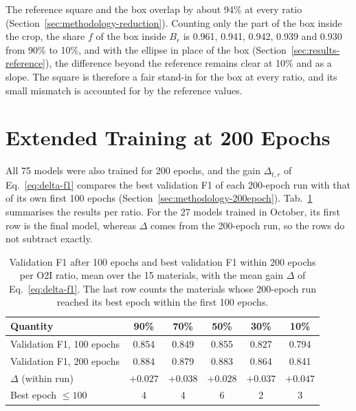 The reference square and the box overlap by about 94\% at every ratio
(Section~\ref{sec:methodology-reduction}).
Counting only the part of the box inside the crop, the share $f$ of the box inside
$B_r$ is 0.961, 0.941, 0.942, 0.939 and 0.930 from 90\% to 10\%, and with the ellipse
in place of the box (Section~\ref{sec:results-reference}), the difference beyond the
reference remains clear at 10\% and as a slope. The square is therefore a fair stand-in for the box at every
ratio, and its small mismatch is accounted for by the reference values.

\FloatBarrier
\section{Extended Training at 200 Epochs}
\label{sec:results-200epoch}

All 75 models were also trained for 200 epochs, and the gain $\Delta_{t,r}$ of
Eq.~\eqref{eq:delta-f1} compares the best validation F1 of each 200-epoch run with
that of its own first 100 epochs (Section~\ref{sec:methodology-200epoch}).
Tab.~\ref{tab:200epoch} summarises the results per ratio. For the 27
models trained in October, its first row is the final model, whereas $\Delta$ comes from the
200-epoch run, so the rows do not subtract exactly.

\begin{table}[htbp]
\centering
\caption[200-epoch check per ratio]{Validation F1 after 100 epochs and best validation
F1 within 200 epochs per O2I ratio, mean over the 15 materials, with the mean gain
$\Delta$ of Eq.~\eqref{eq:delta-f1}. The last row counts the materials whose 200-epoch
run reached its best epoch within the first 100 epochs.}
\label{tab:200epoch}
\small
\begin{tabular}{lccccc}
\toprule
Quantity & 90\% & 70\% & 50\% & 30\% &
10\% \\
\midrule
Validation F1, 100 epochs & 0.854 & 0.849 & 0.855 & 0.827 & 0.794 \\
Validation F1, 200 epochs & 0.884 & 0.879 & 0.883 & 0.864 & 0.841 \\
$\Delta$ (within run) & $+0.027$ & $+0.038$ & $+0.028$ & $+0.037$ & $+0.047$ \\
Best epoch $\le 100$ & 4 & 4 & 6 & 2 & 3 \\
\bottomrule
\end{tabular}
\end{table}

